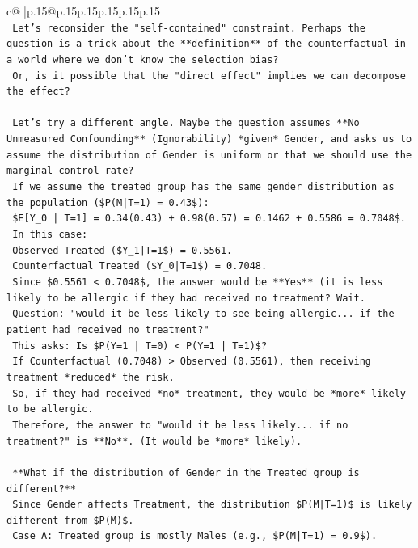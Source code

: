 \documentclass{article}
\begin{document}
{\begin{supertabular}{c@{$\;$}|p{.15\linewidth}@{}p{.15\linewidth}p{.15\linewidth}p{.15\linewidth}p{.15\linewidth}p{.15\linewidth}}
{{{\\ 
\texttt{    Let's reconsider the "self{-}contained" constraint. Perhaps the question is a trick about the **definition** of the counterfactual in a world where we don't know the selection bias?} \\
\texttt{    Or, is it possible that the "direct effect" implies we can decompose the effect?} \\
\\ 
\texttt{    Let's try a different angle. Maybe the question assumes **No Unmeasured Confounding** (Ignorability) *given* Gender, and asks us to assume the distribution of Gender is uniform or that we should use the marginal control rate?} \\
\texttt{    If we assume the treated group has the same gender distribution as the population (\$P(M|T=1) = 0.43\$):} \\
\texttt{    \$E{[}Y\_0 | T=1{]} = 0.34(0.43) + 0.98(0.57) = 0.1462 + 0.5586 = 0.7048\$.} \\
\texttt{    In this case:} \\
\texttt{    Observed Treated (\$Y\_1|T=1\$) = 0.5561.} \\
\texttt{    Counterfactual Treated (\$Y\_0|T=1\$) = 0.7048.} \\
\texttt{    Since \$0.5561 < 0.7048\$, the answer would be **Yes** (it is less likely to be allergic if they had received no treatment? Wait.} \\
\texttt{    Question: "would it be less likely to see being allergic... if the patient had received no treatment?"} \\
\texttt{    This asks: Is \$P(Y=1 | T=0) < P(Y=1 | T=1)\$?} \\
\texttt{    If Counterfactual (0.7048) > Observed (0.5561), then receiving treatment *reduced* the risk.} \\
\texttt{    So, if they had received *no* treatment, they would be *more* likely to be allergic.} \\
\texttt{    Therefore, the answer to "would it be less likely... if no treatment?" is **No**. (It would be *more* likely).} \\
\\ 
\texttt{    **What if the distribution of Gender in the Treated group is different?**} \\
\texttt{    Since Gender affects Treatment, the distribution \$P(M|T=1)\$ is likely different from \$P(M)\$.} \\
\texttt{    Case A: Treated group is mostly Males (e.g., \$P(M|T=1) = 0.9\$).} \\
}}}
\end{supertabular}}
\end{document}
